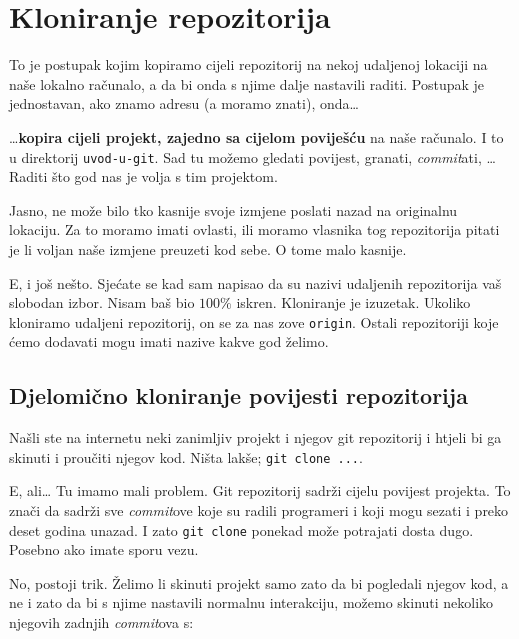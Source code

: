 \section*{Kloniranje repozitorija}

To je postupak kojim kopiramo cijeli repozitorij na nekoj udaljenoj lokaciji na naše lokalno računalo, a da bi onda s njime dalje nastavili raditi.
Postupak je jednostavan, ako znamo adresu (a moramo znati), onda\dots



\dots{}\textbf{kopira cijeli projekt, zajedno sa cijelom poviješću} na naše računalo.
I to u direktorij \verb+uvod-u-git+.
Sad tu možemo gledati povijest, granati, \emph{commit}ati, \dots Raditi što god nas je volja s tim projektom.

Jasno, ne može bilo tko kasnije svoje izmjene poslati nazad na originalnu lokaciju. 
Za to moramo imati ovlasti, ili moramo vlasnika tog repozitorija pitati je li voljan naše izmjene preuzeti kod sebe.
O tome malo kasnije.

E, i još nešto. Sjećate se kad sam napisao da su nazivi udaljenih repozitorija vaš slobodan izbor.
Nisam baš bio $100\%$ iskren. 
Kloniranje je izuzetak.
Ukoliko kloniramo udaljeni repozitorij, on se za nas zove \verb+origin+.
Ostali repozitoriji koje ćemo dodavati mogu imati nazive kakve god želimo.

\subsection*{Djelomično kloniranje povijesti repozitorija}

Našli ste na internetu neki zanimljiv projekt i njegov git repozitorij i htjeli bi ga skinuti i proučiti njegov kod. 
Ništa lakše; \verb+git clone ...+.

E, ali\dots
Tu imamo mali problem.
Git repozitorij sadrži cijelu povijest projekta. 
To znači da sadrži sve \emph{commit}ove koje su radili programeri i koji mogu sezati i preko deset godina unazad.
I zato \verb+git clone+ ponekad može potrajati dosta dugo. 
Posebno ako imate sporu vezu.

No, postoji trik.
Želimo li skinuti projekt samo zato da bi pogledali njegov kod, a ne i zato da bi s njime nastavili normalnu interakciju, možemo skinuti nekoliko njegovih zadnjih \emph{commit}ova s:

